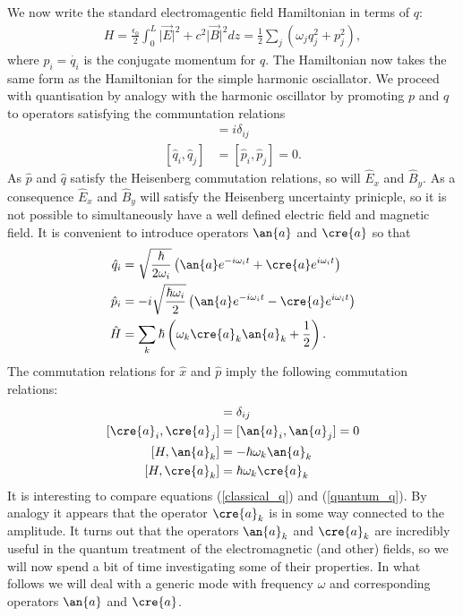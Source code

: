We now write the standard electromagentic field Hamiltonian in terms of $q$:
\begin{align}
  H = \frac{\epsilon_0}{2} \int_0^L \vert \vec{E}\vert^2 + c^2\vert\vec{B}\vert^2 dz 
  = \frac{1}{2} \sum_j \left(\omega_j q_j^2 + p_j^2\right),
\end{align}
where $p_i = \dot{q_i}$ is the conjugate momentum for $q$. The Hamiltonian now takes the same form as the Hamiltonian for the simple harmonic osciallator. We proceed with quantisation by analogy with the harmonic oscillator by promoting $p$ and $q$ to operators satisfying the communtation relations
\begin{align}
  [\hat{q}_i, \hat{p}_j] &= i\delta_{ij} \\
  [\hat{q}_i, \hat{q}_j] &= [\hat{p}_i, \hat{p}_j] = 0.
\end{align}
As $\hat{p}$ and $\hat{q}$ satisfy the Heisenberg commutation relations, so will $\hat{E}_x$ and $\hat{B}_y$. As a consequence $\hat{E}_x$ and $\hat{B}_y$ will satisfy the Heisenberg uncertainty prinicple, so it is not possible to simultaneously have a well defined electric field and magnetic field. It is convenient to introduce operators $\an{a}$ and $\cre{a}$ so that
\begin{align}
  \hat{q}_i &= \sqrt{\frac{\hbar}{2\omega_i}}\left( \an{a}e^{-i\omega_i t} + \cre{a}e^{i\omega_i t}\right)\label{quantum_q} \\
  \hat{p}_i &= -i \sqrt{\frac{\hbar\omega_i}{2}}\left( \an{a}e^{-i\omega_i t} - \cre{a}e^{i\omega_i t}\right)\\
  \hat{H} &= \sum_k \hbar \left( \omega_k \cre{a}_k\an{a}_k +\frac{1}{2} \right).
\end{align}
The commutation relations for $\hat{x}$ and $\hat{p}$ imply the following commutation relations:
\begin{align}
  [\cre{a}_i, \an{a}_j] &= \delta_{ij} \\
  [\cre{a}_i, \cre{a}_j] &= [\an{a}_i, \an{a}_j] = 0 \\
  \left[H, \an{a}_k\right] &= -\hbar \omega_k \an{a}_k\\
  \left[H, \cre{a}_k\right] &= \hbar \omega_k \cre{a}_k
\end{align}
It is interesting to compare equations (\ref{classical_q}) and (\ref{quantum_q}). By analogy it appears that the operator $\cre{a}_k$ is in some way connected to the amplitude. It turns out that the operators $\an{a}_k$ and $\cre{a}_k$ are incredibly useful in the quantum treatment of the electromagnetic (and other) fields, so we will now spend a bit of time investigating some of their properties. In what follows we will deal with a generic mode with frequency $\omega$ and corresponding operators $\an{a}$ and $\cre{a}$.

